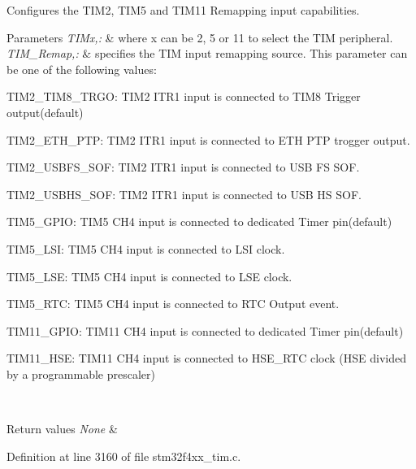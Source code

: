Configures the T\-I\-M2, T\-I\-M5 and T\-I\-M11 Remapping input capabilities. 


\begin{DoxyParams}{Parameters}
{\em T\-I\-Mx,\-:} & where x can be 2, 5 or 11 to select the T\-I\-M peripheral. \\
\hline
{\em T\-I\-M\-\_\-\-Remap,\-:} & specifies the T\-I\-M input remapping source. This parameter can be one of the following values\-: \begin{DoxyItemize}
\item T\-I\-M2\-\_\-\-T\-I\-M8\-\_\-\-T\-R\-G\-O\-: T\-I\-M2 I\-T\-R1 input is connected to T\-I\-M8 Trigger output(default) \item T\-I\-M2\-\_\-\-E\-T\-H\-\_\-\-P\-T\-P\-: T\-I\-M2 I\-T\-R1 input is connected to E\-T\-H P\-T\-P trogger output. \item T\-I\-M2\-\_\-\-U\-S\-B\-F\-S\-\_\-\-S\-O\-F\-: T\-I\-M2 I\-T\-R1 input is connected to U\-S\-B F\-S S\-O\-F. \item T\-I\-M2\-\_\-\-U\-S\-B\-H\-S\-\_\-\-S\-O\-F\-: T\-I\-M2 I\-T\-R1 input is connected to U\-S\-B H\-S S\-O\-F. \item T\-I\-M5\-\_\-\-G\-P\-I\-O\-: T\-I\-M5 C\-H4 input is connected to dedicated Timer pin(default) \item T\-I\-M5\-\_\-\-L\-S\-I\-: T\-I\-M5 C\-H4 input is connected to L\-S\-I clock. \item T\-I\-M5\-\_\-\-L\-S\-E\-: T\-I\-M5 C\-H4 input is connected to L\-S\-E clock. \item T\-I\-M5\-\_\-\-R\-T\-C\-: T\-I\-M5 C\-H4 input is connected to R\-T\-C Output event. \item T\-I\-M11\-\_\-\-G\-P\-I\-O\-: T\-I\-M11 C\-H4 input is connected to dedicated Timer pin(default) \item T\-I\-M11\-\_\-\-H\-S\-E\-: T\-I\-M11 C\-H4 input is connected to H\-S\-E\-\_\-\-R\-T\-C clock (H\-S\-E divided by a programmable prescaler) \end{DoxyItemize}
\\
\hline
\end{DoxyParams}

\begin{DoxyRetVals}{Return values}
{\em None} & \\
\hline
\end{DoxyRetVals}


Definition at line 3160 of file stm32f4xx\-\_\-tim.\-c.

